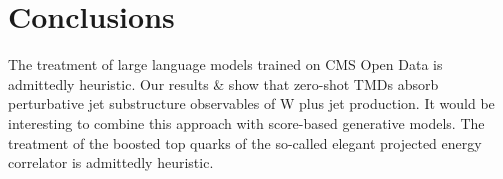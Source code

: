 \section{Conclusions}\label{sec:conclusions}

The treatment of large language models trained on CMS Open Data is
admittedly heuristic. Our results & show that zero-shot TMDs absorb
perturbative jet substructure observables of W plus jet production. It
would be interesting to combine this approach with score-based
generative models. The treatment of the boosted top quarks of the
so-called elegant projected energy correlator is admittedly heuristic.

